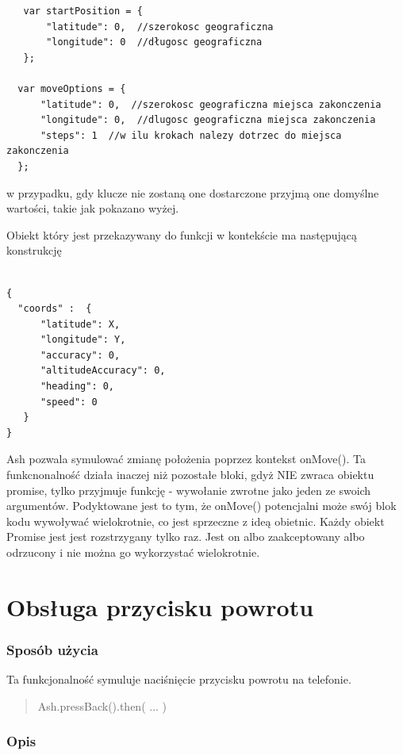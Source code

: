 \documentclass[brudnopis]{xmgr}
\begin{document}
\begin{lstlisting}
   var startPosition = {
       "latitude": 0,  //szerokosc geograficzna
       "longitude": 0  //długosc geograficzna
   };
 
  var moveOptions = {
      "latitude": 0,  //szerokosc geograficzna miejsca zakonczenia
      "longitude": 0,  //dlugosc geograficzna miejsca zakonczenia
      "steps": 1  //w ilu krokach nalezy dotrzec do miejsca zakonczenia
  };
\end{lstlisting}

w przypadku, gdy klucze nie zostaną one dostarczone przyjmą one domyślne wartości, takie jak pokazano wyżej. 

Obiekt który jest przekazywany do funkcji w kontekście ma następującą konstrukcję 

\begin{lstlisting}

{
  "coords" :  {
      "latitude": X, 
      "longitude": Y,
      "accuracy": 0, 
      "altitudeAccuracy": 0, 
      "heading": 0, 
      "speed": 0
   }
}

\end{lstlisting}
Ash pozwala symulować zmianę położenia poprzez kontekst onMove(). Ta funkcnonalność działa inaczej niż pozostałe bloki, gdyż NIE zwraca obiektu promise, tylko przyjmuje funkcję - wywołanie zwrotne jako jeden ze swoich argumentów. Podyktowane jest to tym, że onMove() potencjalni może swój blok kodu wywoływać wielokrotnie, co jest sprzeczne z ideą obietnic. Każdy obiekt Promise jest jest rozstrzygany tylko raz. Jest on albo zaakceptowany albo odrzucony i nie można go wykorzystać wielokrotnie. 

\section{Obsługa przycisku powrotu}

\subsubsection{Sposób użycia}
Ta funkcjonalność symuluje naciśnięcie przycisku powrotu na telefonie. 

\begin{quote}
Ash.pressBack().then( ... ) 
\end{quote}

\subsubsection{Opis}
\end{document}
